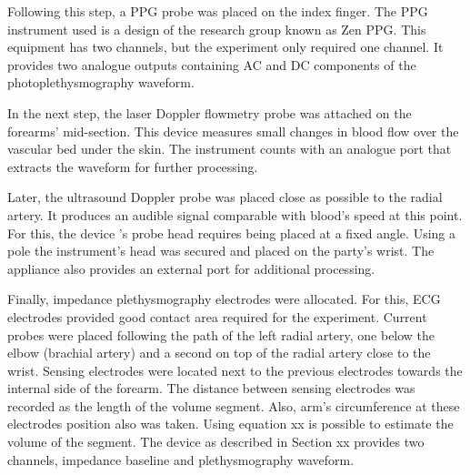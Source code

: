 

Following this step, a PPG probe was placed on the index finger. The PPG instrument used is a design of the research group known as Zen PPG. This equipment has two channels, but the experiment only required one channel. It provides two analogue outputs containing AC and DC components of the photoplethysmography waveform. 


In the next step, the laser Doppler flowmetry probe was attached on the forearms' mid-section. This device measures small changes in blood flow over the vascular bed under the skin. The instrument counts with an analogue port that extracts the waveform for further processing.  



Later, the ultrasound Doppler probe was placed close as possible to the radial artery. It produces an audible signal comparable with blood's speed at this point. For this, the device 's probe head requires being placed at a fixed angle. Using a pole the instrument's head was secured and placed on the party's wrist. The appliance also provides an external port for additional processing.  



Finally, impedance plethysmography electrodes were allocated. For this, ECG electrodes provided good contact area required for the experiment. Current probes were placed following the path of the left radial artery, one below the elbow (brachial artery) and a second on top of the radial artery close to the wrist. Sensing electrodes were located next to the previous electrodes towards the internal side of the forearm. The distance between sensing electrodes was recorded as the length of the volume segment. Also, arm's circumference at these electrodes position also was taken. Using equation xx is possible to estimate the volume of the segment.  The device as described in Section xx provides two channels, impedance baseline and plethysmography waveform. 

